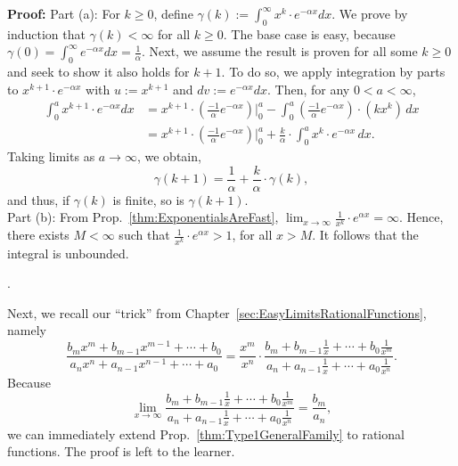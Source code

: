 \textbf{Proof:} Part (a): For $k\ge 0$, define  $\gamma(k):= \int_0^\infty x^k \cdot e^{-\alpha x} dx$. We prove by induction that $\gamma(k) < \infty$ for all $k \ge 0$. The base case is easy, because $\gamma(0) = \int_0^\infty e^{-\alpha x} dx = \frac{1}{\alpha}$. Next, we assume the result is proven for all some $k\ge0$ and seek to show it also holds for $k+1$. To do so, we apply integration by parts to $ x^{k+1} \cdot e^{-\alpha x}$ with $u := x^{k+1} $ and $dv:= e^{-\alpha x} dx$. Then, for any $0 < a < \infty$,
$$
\begin{aligned}
    \int_0^a x^{k+1} \cdot e^{-\alpha x} dx &= x^{k+1} \cdot \left(\frac{-1}{\alpha} e^{-\alpha x} \right) \big|_0^a  - \int_0^a \left( \frac{-1}{\alpha} e^{-\alpha x} \right) \cdot \left(k x^k \right) \,  dx\\
    &= x^{k+1} \cdot \left(\frac{-1}{\alpha} e^{-\alpha x} \right) \big|_0^a  + \frac{k}{\alpha} 
 \cdot \int_0^a  x^k \cdot e^{-\alpha x}\,  dx.
\end{aligned}
$$
Taking limits as $a \to \infty$, we obtain,
$$ \gamma(k+1) = \frac{1}{\alpha} + \frac{k}{\alpha}  \cdot \gamma(k),$$
and thus, if $\gamma(k)$ is finite, so is $\gamma(k+1)$.\\

Part (b): From Prop.~\ref{thm:ExponentialsAreFast}, $\displaystyle \lim_{x \to \infty} \frac{1}{x^k} \cdot e^{\alpha x} = \infty$. Hence, there exists $M<\infty$ such that $\frac{1}{x^k} \cdot e^{\alpha x} > 1$, for all $x>M$. It follows that the integral is unbounded.

\Qed. 

\bigskip

Next, we recall our ``trick'' from Chapter~\ref{sec:EasyLimitsRationalFunctions}, namely 
$$\frac{b_m x^m + b_{m-1} x^{m-1} +  \cdots + b_0}{a_n x^n + a_{n-1} x^{n-1} +  \cdots + a_0} = \boxed{\frac{x^m }{x^n}} \cdot \frac{b_m + b_{m-1} \frac{1}{x} +  \cdots + b_0 \frac{1}{x^m}}{a_n  + a_{n-1} \frac{1}{x} +  \cdots + a_0 \frac{1}{x^n}}.$$
Because 
$$ \lim_{x \to \infty }  \frac{b_m + b_{m-1} \frac{1}{x} +  \cdots + b_0 \frac{1}{x^m}}{a_n  + a_{n-1} \frac{1}{x} +  \cdots + a_0 \frac{1}{x^n}} = \frac{b_m}{a_n},$$
we can immediately extend Prop.~\ref{thm:Type1GeneralFamily} to rational functions. The proof is left to the learner. 

\bigskip

